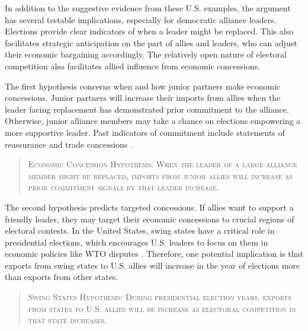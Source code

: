 \documentclass[12pt]{article}
\begin{document}
In addition to the suggestive evidence from these U.S. examples, the argument has several testable implications, especially for democratic alliance leaders.
Elections provide clear indicators of when a leader might be replaced. 
This also facilitates strategic anticipation on the part of allies and leaders, who can adjust their economic bargaining accordingly. 
The relatively open nature of electoral competition also facilitates allied influence from economic concessions. 


The first hypothesis concerns when and how junior partners make economic concessions. 
Junior partners will increase their imports from allies when the leader facing replacement has demonstrated prior commitment to the alliance. 
Otherwise, junior alliance members may take a chance on elections empowering a more supportive leader. 
Past indicators of commitment include statements of reassurance \citep{Blankenship2020} and trade concessions \citep{WolfordKim2017}.


\begin{quote}
\textsc{Economic Concession Hypothesis: When the leader of a large alliance member might be replaced, imports from junior allies will increase as prior commitment signals by that leader increase.}
\end{quote}



The second hypothesis predicts targeted concessions.
If allies want to support a friendly leader, they may target their economic concessions to crucial regions of electoral contests. 
In the United States, swing states have a critical role in presidential elections, which encourages U.S. leaders to focus on them in economic policies like WTO disputes \citep{Conconietal2017}.
Therefore, one potential implication is that exports from swing states to U.S. allies will increase in the year of elections more than exports from other states.

\begin{quote}
\textsc{Swing States Hypothesis: During presidential election years, exports from states to U.S. allies will be increase as electoral competition in that state increases.}
\end{quote}

%
%
%
\end{document}
